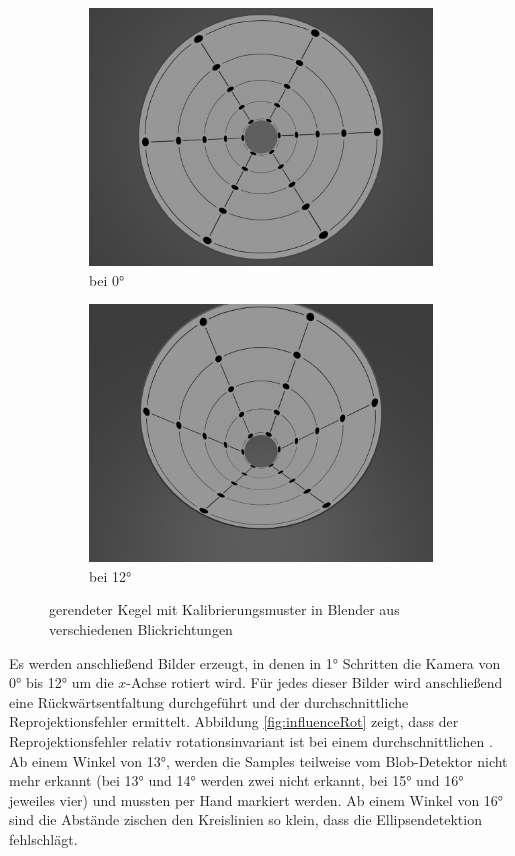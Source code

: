 \begin{figure}[!htb]
	\centering
	\begin{subfigure}{.5\textwidth}
		\centering
		\includegraphics[width=.9\textwidth]{images/blender0.png}
		\caption{bei 0°}
	\end{subfigure}%
	\begin{subfigure}{.5\textwidth}
		\centering
		\includegraphics[width=.9\textwidth]{images/blender12.png}
		\caption{bei 12°}
	\end{subfigure}
	\label{fig:blender}
	\caption{gerendeter Kegel mit Kalibrierungsmuster in Blender aus verschiedenen Blickrichtungen}
\end{figure}


Es werden anschließend Bilder erzeugt, in denen in 1° Schritten die Kamera von 0° bis 12° um die $x$-Achse rotiert wird. Für jedes dieser Bilder wird anschließend eine Rückwärtsentfaltung durchgeführt und der durchschnittliche Reprojektionsfehler ermittelt. Abbildung \ref{fig:influenceRot} zeigt, dass der Reprojektionsfehler relativ rotationsinvariant ist bei einem durchschnittlichen . Ab einem Winkel von  13°, werden die Samples teilweise vom Blob-Detektor nicht mehr erkannt (bei 13° und 14° werden zwei nicht erkannt, bei 15° und 16° jeweiles vier) und mussten per Hand markiert werden. Ab einem Winkel von 16° sind die Abstände zischen den Kreislinien so klein, dass die Ellipsendetektion fehlschlägt. 



